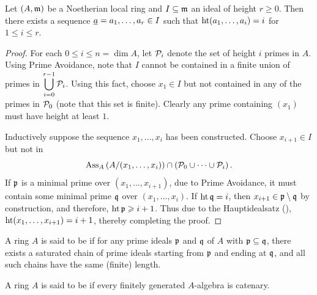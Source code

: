\begin{lemma}
    Let $(A,\mathfrak{m})$ be a Noetherian local ring and $I\subseteq\mathfrak{m}$ an ideal of height $r\ge 0$. Then there exists a sequence $\underline{a} = a_1,\dots,a_r\in I$ such that $\operatorname{ht} (a_1,\dots,a_i) = i$ for $1\le i\le r$.
\end{lemma}
\begin{proof}
    For each $0\le i\le n = \dim A$, let $\mathcal{P}_i$ denote the set of height $i$ primes in $A$. Using Prime Avoidance, note that $I$ cannot be contained in a finite union of primes in $\displaystyle\bigcup_{i = 0}^{r - 1}\mathcal{P}_i$. Using this fact, choose $x_1\in I$ but not contained in any of the primes in $\mathcal{P}_0$ (note that this set is finite). Clearly any prime containing $(x_1)$ must have height at least $1$. 

    Inductively suppose the sequence $x_1,\dots,x_i$ has been constructed. Choose $x_{i + 1}\in I$ but not in 
    \begin{equation*}
        \operatorname{Ass}_A\left(A/(x_1,\dots,x_i)\right)\cap\left(\mathcal{P}_0\cup\dots\cup\mathcal{P}_i\right).
    \end{equation*}
    If $\mathfrak{p}$ is a minimal prime over $(x_1,\dots,x_{i + 1})$, due to Prime Avoidance, it must contain some minimal prime $\mathfrak{q}$ over $(x_1,\dots,x_i)$. If $\operatorname{ht}\mathfrak{q} = i$, then $x_{i + 1}\in\mathfrak{p}\setminus\mathfrak{q}$ by construction, and therefore, $\operatorname{ht}\mathfrak{p}\geqslant i + 1$. Thus due to the Hauptidealsatz (), $\operatorname{ht} (x_1,\dots,x_{i + 1}) = i + 1$, thereby completing the proof.
\end{proof}

\begin{definition}
    A ring $A$ is said to be  if for any prime ideals $\mathfrak{p}$ and $\mathfrak{q}$ of $A$ with $\mathfrak{p}\subseteq\mathfrak{q}$, there exists a saturated chain of prime ideals starting from $\mathfrak{p}$ and ending at $\mathfrak{q}$, and all such chains have the same (finite) length.

    A ring $A$ is said to be  if every finitely generated $A$-algebra is catenary.
\end{definition}

